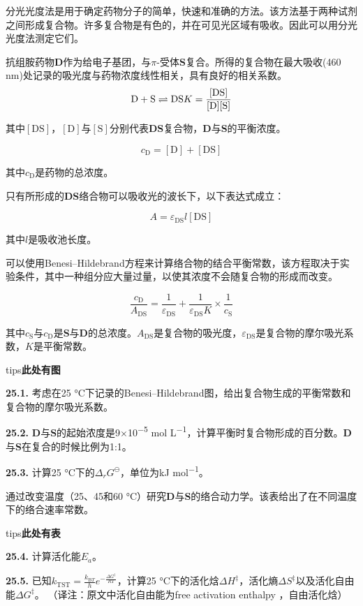 
分光光度法是用于确定药物分子的简单，快速和准确的方法。该方法基于两种试剂之间形成复合物。许多复合物是有色的，并在可见光区域有吸收。因此可以用分光光度法测定它们。

抗组胺药物\textbf{D}作为给电子基团，与$\pi$-受体\textbf{S}复合。所得的复合物在最大吸收(460 nm)处记录的吸光度与药物浓度线性相关，具有良好的相关系数。
$$
\mathrm D+\mathrm S\rightleftharpoons\mathrm {DS}\\
K=\frac{[\mathrm{DS}]}{[\mathrm D][\mathrm S]}
$$

其中\([\mathrm{DS}]\)，\([\mathrm D]\)与\([\mathrm S]\)分别代表\textbf{DS}复合物，\textbf{D}与\textbf{S}的平衡浓度。

\[
c_{\mathrm D}=[\mathrm D]+[\mathrm {DS}]
\] 

其中\(c_{\mathrm D}\)是药物的总浓度。

只有所形成的\textbf{DS}络合物可以吸收光的波长下，以下表达式成立：

 \[
A=\varepsilon_{\mathrm{DS}}l[\mathrm{DS}]
\] 

其中\(l\)是吸收池长度。

可以使用Benesi--Hildebrand方程来计算络合物的结合平衡常数，该方程取决于实验条件，其中一种组分应大量过量，以使其浓度不会随复合物的形成而改变。

\[
\frac{c_{\mathrm D}}{A_{\mathrm{DS}}}=\frac{1}{\varepsilon_{\mathrm{DS}}}+\frac{1}{\varepsilon_{\mathrm{DS}}K}\times\frac{1}{c_{\mathrm S}}
\]

其中\(c_{\mathrm S}\)与\(c_{\mathrm D}\)是\textbf{S}与\textbf{D}的总浓度。\(A_{\mathrm{DS}}\)是复合物的吸光度，\(\varepsilon_{\mathrm{DS}}\)是复合物的摩尔吸光系数，\(K\)是平衡常数。

tips\textbf{此处有图}

\textbf{25.1.} 考虑在25
°C下记录的Benesi--Hildebrand图，给出复合物生成的平衡常数和复合物的摩尔吸光系数。

\textbf{25.2.}
\textbf{D}与\textbf{S}的起始浓度是9×10\textsuperscript{−5} mol
L\textsuperscript{−1}，计算平衡时复合物形成的百分数。\textbf{D}与\textbf{S}在复合的时候比例为1:1。

\textbf{25.3.} 计算25 °C下的\(\Delta_rG^\ominus\)，单位为kJ
mol\textsuperscript{−1}。

通过改变温度（25、45和60 °C）研究\textbf{D}与\textbf{S}的络合动力学。该表给出了在不同温度下的络合速率常数。

tips\textbf{此处有表}

\textbf{25.4.} 计算活化能\(E_a\)。

\textbf{25.5.}
已知\(k_{\mathrm{TST}}=\frac{k_{\mathrm BT}}{h}e^{-\frac{\Delta G^\ddag}{RT}}\)，计算25 °C下的活化焓\(\Delta H^\ddag\)，活化熵\(\Delta S^\ddag\)以及活化自由能\(\Delta G^\ddag\)。
（译注：原文中活化自由能为free activation enthalpy ，自由活化焓）
